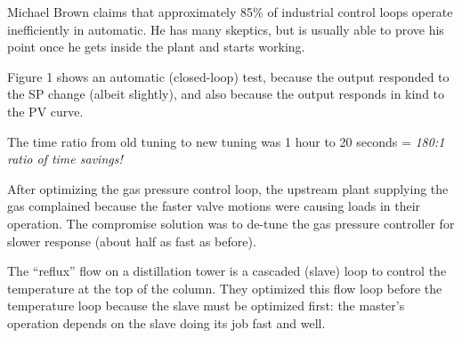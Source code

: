 












Michael Brown claims that approximately 85\% of industrial control loops operate inefficiently in automatic.  He has many skeptics, but is usually able to prove his point once he gets inside the plant and starts working.

\vskip 10pt

Figure 1 shows an automatic (closed-loop) test, because the output responded to the SP change (albeit slightly), and also because the output responds in kind to the PV curve.

\vskip 10pt

The time ratio from old tuning to new tuning was 1 hour to 20 seconds = {\it 180:1 ratio of time savings!}

\vskip 10pt

After optimizing the gas pressure control loop, the upstream plant supplying the gas complained because the faster valve motions were causing loads in their operation.  The compromise solution was to de-tune the gas pressure controller for slower response (about half as fast as before).

\vskip 10pt

The ``reflux'' flow on a distillation tower is a cascaded (slave) loop to control the temperature at the top of the column.  They optimized this flow loop before the temperature loop because the slave must be optimized first: the master's operation depends on the slave doing its job fast and well.





